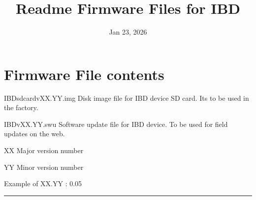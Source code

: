 \documentclass[letterpaper,10pt,english]{sphinxhowto}
\title{Readme Firmware Files for IBD}
\date{Jan 23, 2026}
\author{}
\begin{document}
\pagestyle{empty}

\pagestyle{plain}

\pagestyle{normal}
\label{\detokenize{index::doc}}


\sphinxstepscope


\section{Firmware File contents}
\label{\detokenize{topics/readme_fwf:firmware-file-contents}}\label{\detokenize{topics/readme_fwf::doc}}
\sphinxAtStartPar
IBD\sphinxhyphen{}sdcard\sphinxhyphen{}vXX.YY.img \sphinxhyphen{} Disk image file for IBD device SD card. Its to be used in the factory.

\sphinxAtStartPar
IBD\sphinxhyphen{}vXX.YY.swu \sphinxhyphen{} Software update file for IBD device. To be used for field updates on the web.

\sphinxAtStartPar
XX \sphinxhyphen{} Major version number

\sphinxAtStartPar
YY \sphinxhyphen{} Minor version number

\sphinxAtStartPar
Example of XX.YY : 0.05


\bigskip\hrule\bigskip




\renewcommand{\indexname}{Index}
\printindex
\end{document}
